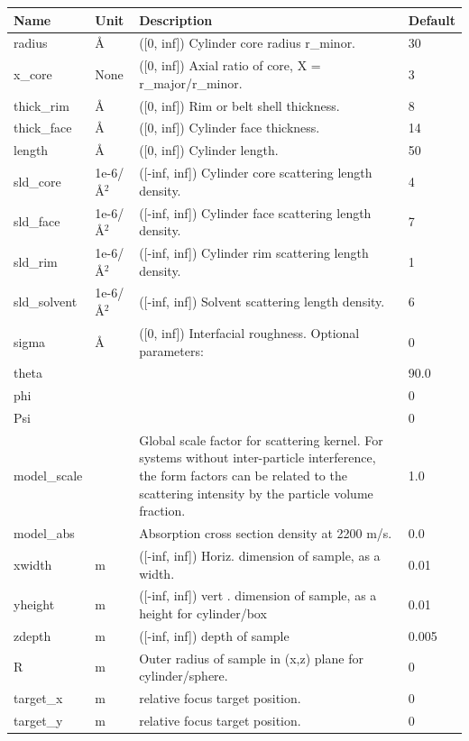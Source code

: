 \begin{longtable}{p{}p{}p{}p{}}
\toprule
\textbf{Name} & \textbf{Unit} & \textbf{Description} & \textbf{Default} \\
\midrule
\endhead
radius & \AA{} & ([0, inf]) Cylinder core radius r\_minor. & 30 \\
x\_core & None & ([0, inf]) Axial ratio of core, X = r\_major/r\_minor. & 3 \\
thick\_rim & \AA{} & ([0, inf]) Rim or belt shell thickness. & 8 \\
thick\_face & \AA{} & ([0, inf]) Cylinder face thickness. & 14 \\
length & \AA{} & ([0, inf]) Cylinder length. & 50 \\
sld\_core & 1e-6/\AA{}$^{2}$ & ([-inf, inf]) Cylinder core scattering length density. & 4 \\
sld\_face & 1e-6/\AA{}$^{2}$ & ([-inf, inf]) Cylinder face scattering length density. & 7 \\
sld\_rim & 1e-6/\AA{}$^{2}$ & ([-inf, inf]) Cylinder rim scattering length density. & 1 \\
sld\_solvent & 1e-6/\AA{}$^{2}$ & ([-inf, inf]) Solvent scattering length density. & 6 \\
sigma & \AA{} & ([0, inf]) Interfacial roughness. Optional parameters: & 0 \\
theta &  &  & 90.0 \\
phi &  &  & 0 \\
Psi &  &  & 0 \\
model\_scale &   & Global scale factor for scattering kernel. For systems without inter-particle interference, the form factors can be related to the scattering intensity by the particle volume fraction. & 1.0 \\
model\_abs &   & Absorption cross section density at 2200 m/s. & 0.0 \\
xwidth & m & ([-inf, inf]) Horiz. dimension of sample, as a width. & 0.01 \\
yheight & m & ([-inf, inf]) vert . dimension of sample, as a height for cylinder/box & 0.01 \\
zdepth & m & ([-inf, inf]) depth of sample & 0.005 \\
R & m & Outer radius of sample in (x,z) plane for cylinder/sphere. & 0 \\
target\_x & m & relative focus target position. & 0 \\
target\_y & m & relative focus target position. & 0 \\

\end{longtable}

